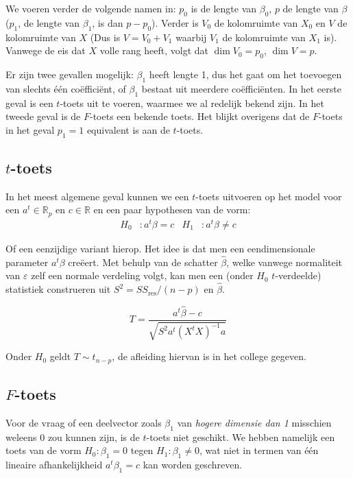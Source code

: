 \documentclass[a4paper]{report}
\begin{document}
  We voeren verder de volgende namen in: $p_0$ is de lengte van $\beta_0$, $p$ de lengte van $\beta$ ($p_1$, de lengte van $\beta_1$, is dan $p-p_0$). Verder is $V_0$ de kolomruimte van $X_0$ en $V$ de kolomruimte van $X$ (Dus is $V = V_0 + V_1$ waarbij $V_1$ de kolomruimte van $X_1$ is). Vanwege de eis dat $X$ volle rang heeft, volgt dat $\dim V_0 = p_0$, $\dim V = p$. 
  
  Er zijn twee gevallen mogelijk: $\beta_1$ heeft lengte 1, dus het gaat om het toevoegen van slechts \' e\' en co\"effici\"ent, of $\beta_1$ bestaat uit meerdere co\"effici\"enten. In het eerste geval is een $t$-toets uit te voeren, waarmee we al redelijk bekend zijn. In het tweede geval is de $F$-toets een bekende toets. Het blijkt overigens dat de $F$-toets in het geval $p_1 = 1$ equivalent is aan de $t$-toets.
  
\subsection{$t$-toets}
\label{t toets}
  In het meest algemene geval kunnen we een $t$-toets uitvoeren op het model voor een $a^t \in \mathbb{R}_p$ en $c \in \mathbb{R}$ en een paar hypothesen van de vorm:
  \begin{align*}
  H_0 &: a^t\beta = c & H_1 &: a^t\beta \neq c
  \end{align*}
  
  Of een eenzijdige variant hierop. Het idee is dat men een eendimensionale parameter $a^t\beta$ cre\"eert. Met behulp van de schatter $\hat{\beta}$, welke vanwege normaliteit van $\varepsilon$ zelf een normale verdeling volgt, kan men een (onder $H_0$ $t$-verdeelde) statistiek construeren uit $S^2 = SS_{\text{res}}/(n-p)$ en $\hat{\beta}$.
  
  \begin{equation}
  \label{t-statistic}
  T = \frac{a^t\hat{\beta}-c}{\sqrt{S^2a^t(X^tX)^{-1}a}}
  \end{equation}
  
  Onder $H_0$ geldt $T \sim t_{n-p}$, de afleiding hiervan is in het college gegeven.
  
\subsection{$F$-toets}
\label{F toets}
  Voor de vraag of een deelvector zoals $\beta_1$ van \emph{hogere dimensie dan 1} misschien weleens $0$ zou kunnen zijn, is de $t$-toets niet geschikt. We hebben namelijk een toets van de vorm $H_0: \beta_1 = 0$ tegen $H_1:\beta_1 \neq 0$, wat niet in termen van \' e\' en lineaire afhankelijkheid $a^t\beta_1 = c$ kan worden geschreven.
  
\end{document}
